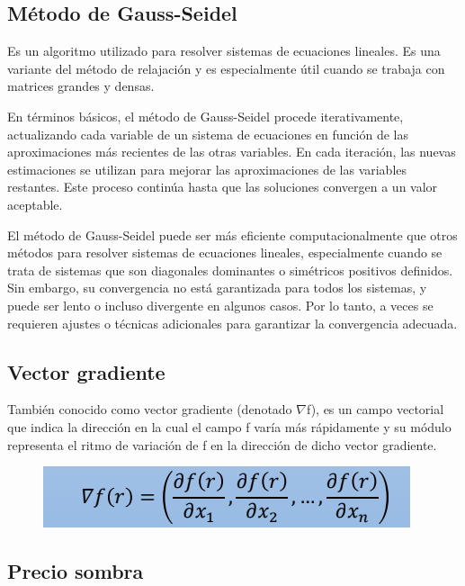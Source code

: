 \documentclass[conference]{IEEEtran}
\begin{document}
\subsection{Método de Gauss-Seidel}

Es un algoritmo utilizado para resolver sistemas de ecuaciones lineales. Es
una variante del método de relajación y es especialmente útil cuando se
trabaja con matrices grandes y densas.

En términos básicos, el método de Gauss-Seidel procede iterativamente,
actualizando cada variable de un sistema de ecuaciones en función de las
aproximaciones más recientes de las otras variables. En cada iteración, las
nuevas estimaciones se utilizan para mejorar las aproximaciones de las
variables restantes. Este proceso continúa hasta que las soluciones convergen
a un valor aceptable.

El método de Gauss-Seidel puede ser más eficiente computacionalmente que
otros métodos para resolver sistemas de ecuaciones lineales, especialmente
cuando se trata de sistemas que son diagonales dominantes o simétricos
positivos definidos. Sin embargo, su convergencia no está garantizada para
todos los sistemas, y puede ser lento o incluso divergente en algunos casos.
Por lo tanto, a veces se requieren ajustes o técnicas adicionales para
garantizar la convergencia adecuada.

\subsection{Vector gradiente}

También conocido como vector gradiente (denotado $\nabla$f), es un
campo vectorial que indica la dirección en la cual el campo f varía más
rápidamente y su módulo representa el ritmo de variación de f en la dirección
de dicho vector gradiente.

\begin{figure}[H]
    \begin{center}
        \includegraphics[width=\linewidth]{./Images/VectorGradiente.png}
        \caption{}
    \end{center}
\end{figure}

\subsection{Precio sombra}
\end{document}
